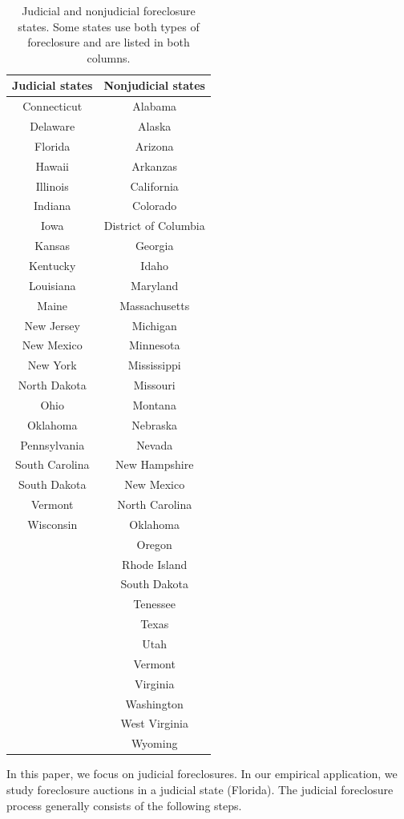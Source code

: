 \documentclass[11pt,twopage]{article}
\begin{document}
\begin{table}[t!]
\centering
\begin{tabular}{c c} 
 \hline
Judicial states & Nonjudicial states  \\ [0.5ex] 
 \hline
 Connecticut & Alabama  \\ 
 Delaware & Alaska  \\
 Florida & Arizona \\
Hawaii & Arkanzas  \\
 Illinois & California  \\
 Indiana & Colorado \\
 Iowa & District of Columbia\\
 Kansas & Georgia \\
 Kentucky & Idaho \\
 Louisiana & Maryland\\
 Maine & Massachusetts \\
 New Jersey & Michigan\\
 New Mexico & Minnesota\\
 New York & Mississippi\\
 North Dakota & Missouri\\
 Ohio & Montana\\
 Oklahoma & Nebraska \\
 Pennsylvania & Nevada \\
 South Carolina & New Hampshire\\
 South Dakota & New Mexico\\
 Vermont & North Carolina\\
 Wisconsin & Oklahoma\\
 & Oregon \\
 & Rhode Island \\
 & South Dakota \\
 & Tenessee \\
 & Texas \\
 & Utah \\
 & Vermont \\
 & Virginia \\
 & Washington \\
 & West Virginia \\
 & Wyoming \\
  [1ex] 
 \hline
\end{tabular}
\caption{Judicial and nonjudicial foreclosure states. Some states use both types of foreclosure and are listed in both columns.}
\label{table:1}
\end{table}

In this paper, we focus on judicial foreclosures. In our empirical application, we study foreclosure auctions in a judicial state (Florida). The judicial foreclosure process generally consists of the following steps. 
\end{document}
